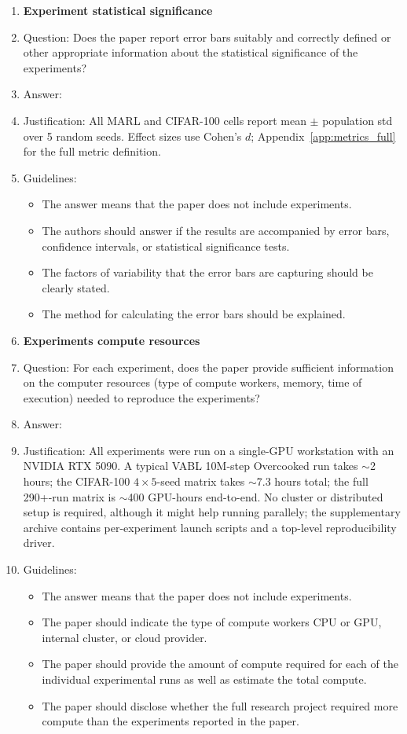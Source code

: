 \begin{enumerate}
\item {\bf Experiment statistical significance}
    \item[] Question: Does the paper report error bars suitably and correctly defined or other appropriate information about the statistical significance of the experiments?
    \item[] Answer: \answerYes{}
    \item[] Justification: All MARL and CIFAR-100 cells report mean $\pm$ population std over 5 random seeds. Effect sizes use Cohen's $d$; Appendix~\ref{app:metrics_full} for the full metric definition.
    \item[] Guidelines:
    \begin{itemize}
        \item The answer \answerNA{} means that the paper does not include experiments.
        \item The authors should answer \answerYes{} if the results are accompanied by error bars, confidence intervals, or statistical significance tests.
        \item The factors of variability that the error bars are capturing should be clearly stated.
        \item The method for calculating the error bars should be explained.
    \end{itemize}

\item {\bf Experiments compute resources}
    \item[] Question: For each experiment, does the paper provide sufficient information on the computer resources (type of compute workers, memory, time of execution) needed to reproduce the experiments?
    \item[] Answer: \answerYes{}
    \item[] Justification: All experiments were run on a single-GPU workstation with an NVIDIA RTX 5090. A typical VABL 10M-step Overcooked run takes $\sim$2 hours; the CIFAR-100 $4 \times 5$-seed matrix takes $\sim$7.3 hours total; the full 290{+}-run matrix is $\sim$400 GPU-hours end-to-end. No cluster or distributed setup is required, although it might help running parallely; the supplementary archive contains per-experiment launch scripts and a top-level reproducibility driver.
    \item[] Guidelines:
    \begin{itemize}
        \item The answer \answerNA{} means that the paper does not include experiments.
        \item The paper should indicate the type of compute workers CPU or GPU, internal cluster, or cloud provider.
        \item The paper should provide the amount of compute required for each of the individual experimental runs as well as estimate the total compute.
        \item The paper should disclose whether the full research project required more compute than the experiments reported in the paper.
    \end{itemize}


\end{enumerate}
